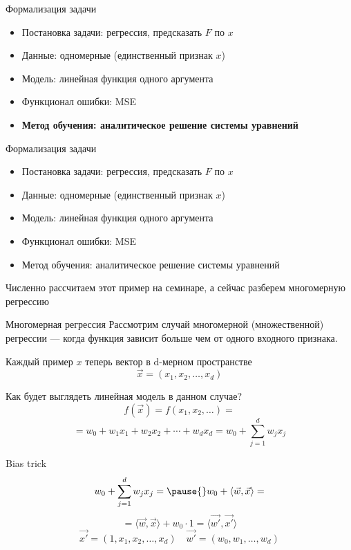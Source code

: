 \documentclass[aspectratio=169, professionalfonts]{beamer}
\begin{document}
\begin{frame}{Формализация задачи}
    \begin{itemize}
        \item Постановка задачи: регрессия, предсказать \( F \) по \( x \)
        \item Данные: одномерные (единственный признак \( x \))
        \item Модель: линейная функция одного аргумента
        \item Функционал ошибки: MSE
        \item \textbf{Метод обучения: аналитическое решение системы уравнений}
    \end{itemize}
\end{frame}

\begin{frame}{Формализация задачи}
    \begin{itemize}
        \item Постановка задачи: регрессия, предсказать \( F \) по \( x \)
        \item Данные: одномерные (единственный признак \( x \))
        \item Модель: линейная функция одного аргумента
        \item Функционал ошибки: MSE
        \item Метод обучения: аналитическое решение системы уравнений
    \end{itemize}

    Численно рассчитаем этот пример на семинаре, а сейчас разберем многомерную регрессию
\end{frame}

\begin{frame}{Многомерная регрессия}
    Рассмотрим случай многомерной (множественной) регрессии --- когда функция зависит больше чем
    от одного входного признака.

    Каждый пример \( x \) теперь вектор в d-мерном пространстве
    \[ \vec{x} = {(x_1, x_2, \ldots, x_d)} \]

    Как будет выглядеть линейная модель в данном случае?
    \[ f(\vec{x}) = f(x_1, x_2, \ldots) = \]
    \pause
    \[ = w_0 + w_1 x_1 + w_2 x_2 + \cdots + w_d x_d = w_0 + \sum_{j=1}^d w_j x_j \]
\end{frame}

\begin{frame}{Bias trick}
    \LARGE
    \[ w_0 + \sum_{j=1}^d w_j x_j = \pause{} w_0 + \langle \vec{w}, \vec{x} \rangle = \]
    \pause
    \[ = \langle \vec{w}, \vec{x} \rangle + w_0 \cdot 1 = \langle \vec{w'}, \vec{x'} \rangle \]
    \[ \vec{x'} = (1, x_1, x_2, \dots, x_d) \quad \vec{w'} = (w_0, w_1, \dots, w_d) \]
\end{frame}
\end{document}
